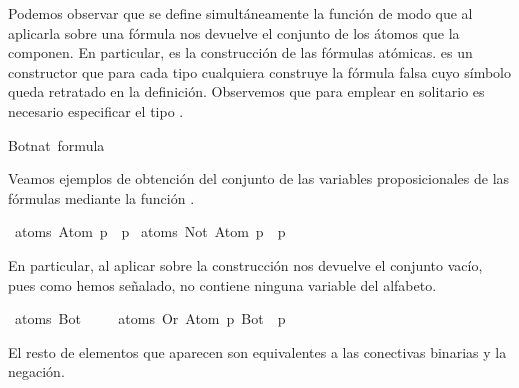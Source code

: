 \begin{isabellebody}
\begin{isamarkuptext}
Podemos observar que se define simultáneamente la función  de modo que al aplicarla 
sobre una fórmula nos devuelve el conjunto de los átomos que la componen.
En particular,  es la construcción de las fórmulas atómicas.  es un constructor que 
para cada tipo  cualquiera construye la fórmula falsa cuyo símbolo queda retratado en la 
definición. Observemos que para emplear  en solitario es necesario especificar el tipo .%
\end{isamarkuptext}\isamarkuptrue%
\isamarkupfalse%
{\isachardoublequoteopen}{\isacharparenleft}Bot{\isacharcolon}{\isacharcolon}nat\ formula{\isacharparenright}{\isachardoublequoteclose}%
\begin{isamarkuptext}%
Veamos ejemplos de obtención del conjunto de las variables proposicionales de las fórmulas 
mediante la función .%
\end{isamarkuptext}\isamarkuptrue%
\isamarkupfalse%
\ {\isachardoublequoteopen}atoms\ {\isacharparenleft}Atom\ p{\isacharparenright}\ {\isacharequal}\ {\isacharbraceleft}p{\isacharbraceright}{\isachardoublequoteclose}\isanewline
\isanewline
{}\isamarkupfalse%
\ {\isachardoublequoteopen}atoms\ {\isacharparenleft}Not\ {\isacharparenleft}Atom\ p{\isacharparenright}{\isacharparenright}\ {\isacharequal}\ {\isacharbraceleft}p{\isacharbraceright}{\isachardoublequoteclose}%
\begin{isamarkuptext}%
En particular, al aplicar  sobre la construcción  nos devuelve el conjunto
vacío, pues como hemos señalado, no contiene ninguna variable del alfabeto.%
\end{isamarkuptext}\isamarkuptrue%
\isamarkupfalse%
\ {\isachardoublequoteopen}atoms\ Bot\ {\isacharequal}\ {\isacharbraceleft}{\isacharbraceright}{\isachardoublequoteclose}\isanewline
\ %
\isadelimproof
%
\endisadelimproof
%
\isatagproof
%
\endisatagproof
{\isafoldproof}%
%
\isadelimproof
%
\endisadelimproof
\isanewline
{}\isamarkupfalse%
\ {\isachardoublequoteopen}atoms\ {\isacharparenleft}Or\ {\isacharparenleft}Atom\ p{\isacharparenright}\ Bot{\isacharparenright}\ {\isacharequal}\ {\isacharbraceleft}p{\isacharbraceright}{\isachardoublequoteclose}\isanewline
\ %
\isadelimproof
%
\endisadelimproof
%
\isatagproof
%
\endisatagproof
{\isafoldproof}%
%
\isadelimproof
%
\endisadelimproof
%
\begin{isamarkuptext}%
El resto de elementos que aparecen son equivalentes a las conectivas binarias y la negación. 

\end{isamarkuptext}
\end{isabellebody}
